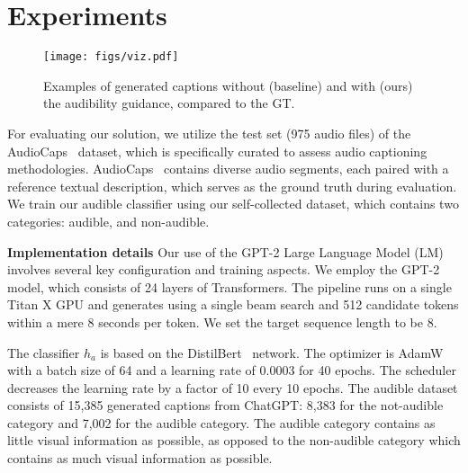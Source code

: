 \documentclass{article}
\begin{document}
 





























\section{Experiments}

\begin{figure}[t]
    \centering
    \texttt{[image: figs/viz.pdf]}
    \vspace{-7mm}
    \caption{Examples of generated captions without (baseline) and with (ours) the audibility guidance, compared to the GT.}
    \label{fig:viz}
    \vspace{-5mm}
\end{figure}


For evaluating our solution, we utilize the test set (975 audio files) of the AudioCaps~\cite{kim2019audiocaps} dataset, which is specifically curated to assess audio captioning methodologies. AudioCaps~\cite{kim2019audiocaps} contains diverse audio segments, each paired with a reference textual description, which serves as the ground truth during evaluation. We train our audible classifier using our self-collected dataset, which contains two categories: audible, and non-audible.


\noindent\textbf{Implementation details\quad}
Our use of the GPT-2 Large Language Model (LM) involves several key configuration and training aspects. We employ the GPT-2 model, which consists of 24 layers of Transformers. 
The pipeline runs on a single Titan X GPU and generates using a single beam search and 512 candidate tokens within a mere 8 seconds per token. We set the target sequence length to be 8.


The classifier $h_a$ is based on the DistilBert~\cite{sanh2019distilbert} network. The optimizer is AdamW with a batch size of 64 and a learning rate of 0.0003 for 40 epochs. The scheduler decreases the learning rate by a factor of 10 every 10 epochs. The audible dataset consists of 15,385 generated captions from ChatGPT: 8,383 for the not-audible category and 7,002 for the audible category. The audible category contains as little visual information as possible, as opposed to the non-audible category which contains as much visual information as possible.
\end{document}
